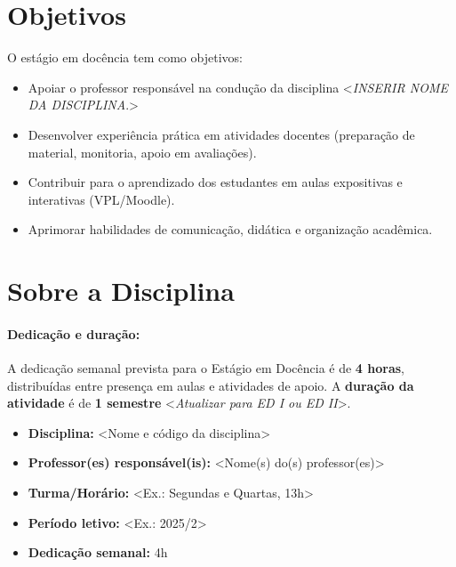 \documentclass[12pt, a4paper]{article}
\begin{document}
\maketitle

\section{Objetivos} \label{sec:objetivos} %

O estágio em docência tem como objetivos:

\begin{itemize}
    \item Apoiar o professor responsável na condução da disciplina <\textit{INSERIR NOME DA DISCIPLINA}.>
    \item Desenvolver experiência prática em atividades docentes (preparação de material, monitoria, apoio em avaliações).
    \item Contribuir para o aprendizado dos estudantes em aulas expositivas e interativas (VPL/Moodle).
    \item Aprimorar habilidades de comunicação, didática e organização acadêmica.
\end{itemize}

\section{Sobre a Disciplina} \label{sec:disciplina} %

\paragraph{Dedicação e duração:} A dedicação semanal prevista para o Estágio em Docência é de \textbf{4 horas}, distribuídas entre presença em aulas e atividades de apoio. A \textbf{duração da atividade} é de \textbf{1 semestre} <\textit{Atualizar para ED I ou ED II}>.


\begin{itemize}
    \item \textbf{Disciplina:} <Nome e código da disciplina>
    \item \textbf{Professor(es) responsável(is):} <Nome(s) do(s) professor(es)>
    \item \textbf{Turma/Horário:} <Ex.: Segundas e Quartas, 13h>
    \item \textbf{Período letivo:} <Ex.: 2025/2>
    \item \textbf{Dedicação semanal:} 4h
\end{itemize}
\end{document}
